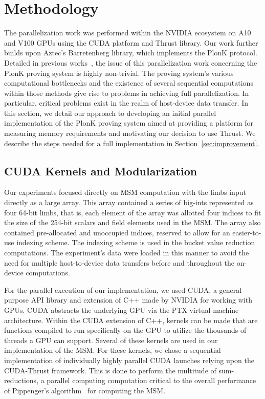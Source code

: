 \documentclass[sigconf]{acmart}
\begin{document}
\section{Methodology}
\label{sec:methodology}
The parallelization work was performed within the NVIDIA ecosystem on A10 and V100 GPUs using the CUDA platform and Thrust library. Our work further builds upon Aztec's Barretenberg library, which implements the PlonK protocol. 
Detailed in previous works~\cite{ZKVDBS23,TalTurboUltraPlonKFeb23}, the issue of this parallelization work concerning the PlonK proving system is highly non-trivial. The proving system's various computational bottlenecks and the existence of several sequential computations within those methods \cite{Pipelonk26,sumcheck2025} give rise to  problems in achieving full parallelization. In particular, critical problems exist in the realm of host-device data transfer. In this section, we detail our approach to developing an initial parallel implementation of the PlonK proving system aimed at providing a platform for measuring memory requirements and motivating our decision to use Thrust. We describe the steps needed for a full
implementation in Section~\ref{sec:improvement}.

\subsection{CUDA Kernels and Modularization}
Our experiments focused directly on MSM computation with the limbs input directly as a large array. This array contained a series of big-ints represented as four 64-bit limbs, that is, each element of the array was allotted four indices to fit the size of the 254-bit scalars and field elements used in the MSM. The array also contained pre-allocated and unoccupied indices, reserved to allow for an easier-to-use indexing scheme. The indexing scheme is used in the bucket value reduction computations. The experiment's data were loaded in this manner to avoid the need for multiple host-to-device data transfers before and throughout the on-device computations. 

For the parallel execution of our implementation, we used CUDA, a general purpose API library and extension of C++ made by NVIDIA for working with GPUs. CUDA abstracts the underlying GPU via the PTX virtual-machine architecture.  Within the CUDA extension of C++, kernels can be made that are functions compiled to run specifically on the GPU to utilize the thousands of threads a GPU can support. Several of these kernels are used in our implementation of the MSM. For these kernels, we chose a sequential implementation of individually highly parallel CUDA launches relying upon the CUDA-Thrust framework. This is done to perform the multitude of sum-reductions, a parallel computing computation critical to the overall performance of Pippenger's algorithm~\cite{Bernstein2002PippengersEA} for computing the MSM.
\end{document}
